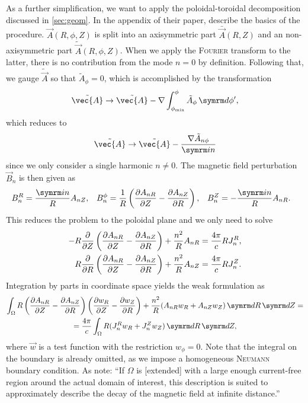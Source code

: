 As a further simplification, we want to apply the poloidal-toroidal decomposition discussed in \cref{sec:geom}. In the appendix of their paper, \textcite{Heyn08} describe the basics of the procedure. $\vec{A} (R, \phi, Z)$ is split into an axisymmetric part $\bar{\vec{A}} (R, Z)$ and an non-axisymmetric part $\tilde{\vec{A}} (R, \phi, Z)$. When we apply the \textsc{Fourier} transform to the latter, there is no contribution from the mode $n = 0$ by definition. Following that, we gauge $\tilde{\vec{A}}$ so that $\tilde{A}_{\phi} = 0$, which is accomplished by the transformation
\begin{gather}
  \tilde{\vec{A}} \to \tilde{\vec{A}} - \grad \int_{\phi_{\min}}^{\phi} \tilde{A}_{\phi} \, \diff \phi',
\end{gather}
which reduces to
\begin{gather}
  \tilde{\vec{A}} \to \tilde{\vec{A}} - \frac{\grad \tilde{A}_{n \phi}}{\im n}
\end{gather}
since we only consider a single harmonic $n \neq 0$. The magnetic field perturbation $\vec{B}_{n}$ is then given as
\begin{align}
  B_{n}^{R} &= \frac{\im n}{R} A_{n Z}, & B_{n}^{\phi} &= \frac{1}{R} \left ( \pd[A_{n R}]{Z} - \pd[A_{n Z}]{R} \right ), & B_{n}^{Z} &= -\frac{\im n}{R} A_{n R}.
\end{align}
This reduces the problem to the poloidal plane and we only need to solve
\begin{align}
  -R \pd{Z} \left ( \pd[A_{n R}]{Z} - \pd[A_{n Z}]{R} \right ) + \frac{n^{2}}{R} A_{n R} &= \frac{4 \pi}{c} R J_{n}^{R}, \\
  R \pd{R} \left ( \pd[A_{n R}]{Z} - \pd[A_{n Z}]{R} \right ) + \frac{n^{2}}{R} A_{n Z} &= \frac{4 \pi}{c} R J_{n}^{Z}.
\end{align}
Integration by parts in coordinate space yields the weak formulation as
\begin{multline}
  \int_{\Omega} R \left ( \pd[A_{n R}]{Z} - \pd[A_{n Z}]{R} \right ) \left ( \pd[w_{R}]{Z} - \pd[w_{Z}]{R} \right ) + \frac{n^{2}}{R} (A_{n R} w_{R} + A_{n Z} w_{Z}) \, \diff R \, \diff Z = \\ = \frac{4 \pi}{c} \int_{\Omega} R (J_{n}^{R} w_{R} + J_{n}^{Z} w_{Z}) \, \diff R \, \diff Z,
\end{multline}
where $\vec{w}$ is a test function with the restriction $w_{\phi} = 0$. Note that the integral on the boundary is already omitted, as we impose a homogeneous \textsc{Neumann} boundary condition. As \textcite{Albert16} note: \enquote{If $\Omega$ is [extended] with a large enough current-free region around the actual domain of interest, this description is suited to approximately describe the decay of the magnetic field at infinite distance.}

